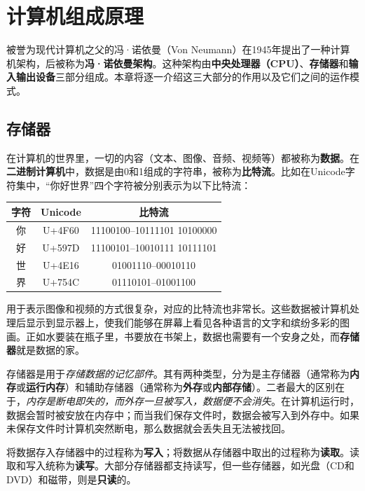 \chapter{计算机组成原理}\label{ch:arch}

被誉为现代计算机之父的冯·诺依曼（Von Neumann）在1945年提出了一种计算机架构，后被称为\textbf{冯·诺依曼架构}。这种架构由\textbf{中央处理器（CPU）}、\textbf{存储器}和\textbf{输入输出设备}三部分组成。本章将逐一介绍这三大部分的作用以及它们之间的运作模式。


\section{存储器}\label{sec:arch:storage}

在计算机的世界里，一切的内容（文本、图像、音频、视频等）都被称为\textbf{数据}。在\textbf{二进制计算机}中，数据是由0和1组成的字符串，被称为\textbf{比特流}。比如在Unicode字符集中，“你好世界”四个字符被分别表示为以下比特流：

\begin{center}
    \begin{tabular}{c c c }
        \hline
        字符 & Unicode & 比特流                         \\
        \hline
        你  & U+4F60  & 11100100--10111101 10100000 \\
        好  & U+597D  & 11100101--10010111 10111101 \\
        世  & U+4E16  & 01001110--00010110          \\
        界  & U+754C  & 01110101--01001100          \\
        \hline
    \end{tabular}
\end{center}

用于表示图像和视频的方式很复杂，对应的比特流也非常长。这些数据被计算机处理后显示到显示器上，使我们能够在屏幕上看见各种语言的文字和缤纷多彩的图画。正如水要装在瓶子里，书要放在书架上，数据也需要有一个安身之处，而\textbf{存储器}就是数据的家。

存储器是用于\textit{存储数据的记忆部件}。其有两种类型，分为是主存储器（通常称为\textbf{内存}或\textbf{运行内存}）和辅助存储器（通常称为\textbf{外存}或\textbf{内部存储}）。二者最大的区别在于，\textit{内存是断电即失的，而外存一旦被写入，数据便不会消失}。在计算机运行时，数据会暂时被安放在内存中；而当我们保存文件时，数据会被写入到外存中。如果未保存文件时计算机突然断电，那么数据就会丢失且无法被找回。

将数据存入存储器中的过程称为\textbf{写入}；将数据从存储器中取出的过程称为\textbf{读取}。读取和写入统称为\textbf{读写}。大部分存储器都支持读写，但一些存储器，如光盘（CD和DVD）和磁带，则是\textbf{只读}的。

